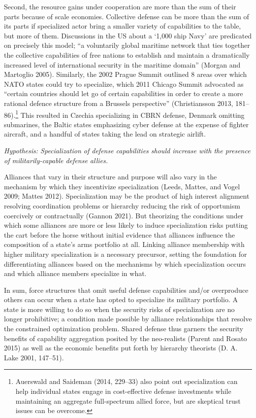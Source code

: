\documentclass[
  12,
  letterpaper,
  DIV=11,
  numbers=noendperiod]{scrartcl}
\begin{document}
Second, the resource gains under cooperation are more than the sum of
their parts because of scale economies. Collective defense can be more
than the sum of its parts if specialized actor bring a smaller variety
of capabilities to the table, but more of them. Discussions in the US
about a `1,000 ship Navy' are predicated on precisely this model; ``a
voluntarily global maritime network that ties together the collective
capabilities of free nations to establish and maintain a dramatically
increased level of international security in the maritime domain''
(Morgan and Martoglio 2005). Similarly, the 2002 Prague Summit outlined
8 areas over which NATO states could try to specialize, which 2011
Chicago Summit advocated as ``certain countries should let go of certain
capabilities in order to create a more rational defence structure from a
Brussels perspective'' (Christiansson 2013, 181--86).\footnote{Auerswald
  and Saideman (2014, 229--33) also point out specialization can help
  individual states engage in cost-effective defense investments while
  maintaining an aggregate full-spectrum allied force, but are skeptical
  trust issues can be overcome.} This resulted in Czechia specializing
in CBRN defense, Denmark omitting submarines, the Baltic states
emphasizing cyber defense at the expense of fighter aircraft, and a
handful of states taking the lead on strategic airlift.

\emph{Hypothesis: Specialization of defense capabilities should increase
with the presence of militarily-capable defense allies.}

Alliances that vary in their structure and purpose will also vary in the
mechanism by which they incentivize specialization (Leeds, Mattes, and
Vogel 2009; Mattes 2012). Specialization may be the product of high
interest alignment resolving coordination problems or hierarchy reducing
the risk of opportunism coercively or contractually (Gannon 2021). But
theorizing the conditions under which some alliances are more or less
likely to induce specialization risks putting the cart before the horse
without initial evidence that alliances influence the composition of a
state's arms portfolio at all. Linking alliance membership with higher
military specialization is a necessary precursor, setting the foundation
for differentiating alliances based on the mechanisms by which
specialization occurs and which alliance members specialize in what.

In sum, force structures that omit useful defense capabilities and/or
overproduce others can occur when a state has opted to specialize its
military portfolio. A state is more willing to do so when the security
risks of specialization are no longer prohibitive; a condition made
possible by alliance relationships that resolve the constrained
optimization problem. Shared defense thus garners the security benefits
of capability aggregation posited by the neo-realists (Parent and Rosato
2015) as well as the economic benefits put forth by hierarchy theorists
(D. A. Lake 2001, 147--51).
\end{document}
